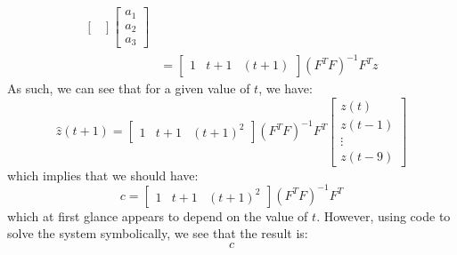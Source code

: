 \documentclass[12pt]{exam}
\begin{document}
\begin{questions}
\begin{enumerate}[label=(\alph*)]
\begin{align*}
\begin{bmatrix}
        \end{bmatrix}
        \begin{bmatrix}
          a_1 \\
          a_2 \\
          a_3
        \end{bmatrix}\\
      &= 
        \begin{bmatrix}
          1 & t + 1 & (t+1) 
        \end{bmatrix}(F^TF)^{-1}F^Tz
    \end{align*}
    As such, we can see that for a given value of $t$, we have:
    \[
      \hat{z}(t+1) =
        \begin{bmatrix}
          1 & t + 1 & (t+1)^2
        \end{bmatrix} (F^TF)^{-1}F^T
        \begin{bmatrix}
          z(t) \\
          z(t-1) \\
          \vdots \\
          z(t-9)
        \end{bmatrix}
    \]
    which implies that we should have:
    \[
      c =  \begin{bmatrix}
          1 & t + 1 & (t+1)^2
        \end{bmatrix} (F^TF)^{-1}F^T
    \]
    which at first glance appears to depend on the value of $t$. However, using code to solve the system symbolically, we see that the result is:
    \[
      c
    \]
  \end{enumerate}
\end{questions}
\end{document}
